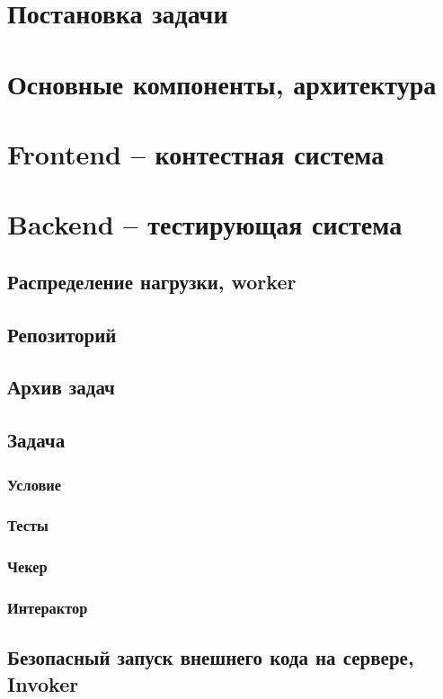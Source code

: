 \chapter{Постановка задачи}

\chapter{Основные компоненты, архитектура}

\chapter{Frontend -- контестная система}

\chapter{Backend -- тестирующая система}

\section{Распределение нагрузки, worker}

\section{Репозиторий}

\section{Архив задач}

\section{Задача}

\subsection{}

\subsection{Условие}

\subsection{Тесты}

\subsection{Чекер}

\subsection{Интерактор}

\section{Безопасный запуск внешнего кода на сервере, Invoker}
